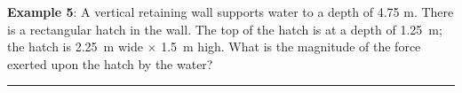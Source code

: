 \documentclass[10pt,onesided]{amsart}
\begin{document}
\begin{minipage}[t]{0.45\textwidth}
	\raggedright
	\textbf{Example 5}:
	\parb
	A vertical retaining wall supports water to a depth of 4.75 m. There
	is a rectangular hatch in the wall. The top of the hatch is at a depth of 1.25~m; the hatch is 2.25~m wide
	$\times$ 1.5~m high.
	\parb
	What is the magnitude of the force exerted upon the hatch by the water?
\end{minipage}
%
\parb\vspace{6cm}
\rule{\textwidth}{0.02in}

\end{document}
